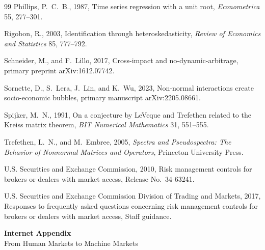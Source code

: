 \documentclass[12pt]{article}
\theoremstyle{definition}
\theoremstyle{remark}
\begin{document}
\begin{thebibliography}{99}
Phillips, P.~C.~B., 1987, Time series regression with a unit root, \emph{Econometrica} 55, 277--301.

Rigobon, R., 2003, Identification through heteroskedasticity, \emph{Review of Economics and Statistics} 85, 777--792.

Schneider, M., and F.~Lillo, 2017, Cross-impact and no-dynamic-arbitrage, primary preprint arXiv:1612.07742.

Sornette, D., S.~Lera, J.~Lin, and K.~Wu, 2023, Non-normal interactions create socio-economic bubbles, primary manuscript arXiv:2205.08661.

Spijker, M.~N., 1991, On a conjecture by LeVeque and Trefethen related to the Kreiss matrix theorem, \emph{BIT Numerical Mathematics} 31, 551--555.

Trefethen, L.~N., and M.~Embree, 2005, \emph{Spectra and Pseudospectra: The Behavior of Nonnormal Matrices and Operators}, Princeton University Press.

U.S. Securities and Exchange Commission, 2010, Risk management controls for brokers or dealers with market access, Release No.~34-63241.

U.S. Securities and Exchange Commission Division of Trading and Markets, 2017, Responses to frequently asked questions concerning risk management controls for brokers or dealers with market access, Staff guidance.

\end{thebibliography}

\clearpage
\appendix
\setcounter{section}{0}
\renewcommand{\thesection}{IA.\Alph{section}}
\renewcommand{\theequation}{IA.\arabic{equation}}
\renewcommand{\theHequation}{IA.\arabic{equation}}
\renewcommand{\thetable}{IA.\arabic{table}}
\renewcommand{\theHtable}{IA.\arabic{table}}
\renewcommand{\thefigure}{IA.\arabic{figure}}
\renewcommand{\theHfigure}{IA.\arabic{figure}}
\setcounter{equation}{0}
\setcounter{table}{0}
\setcounter{figure}{0}
\begin{center}
{\LARGE\bfseries Internet Appendix}\\[0.6em]
{\large From Human Markets to Machine Markets}
\end{center}
\vspace{1em}
\end{document}
